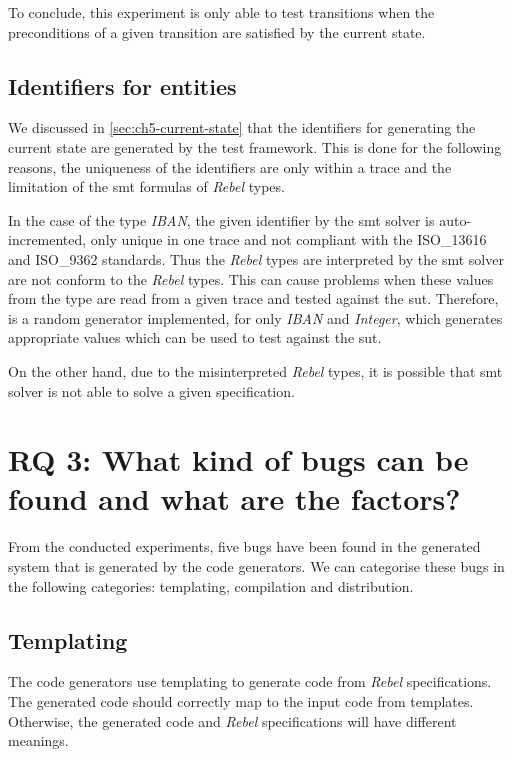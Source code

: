 To conclude, this experiment is only able to test transitions when the
preconditions of a given transition are satisfied by the current state.


\subsection{Identifiers for entities}
We discussed in \autoref{sec:ch5-current-state} that the identifiers for
generating the current state are generated by the test framework. This is done
for the following reasons, the uniqueness of the identifiers are only within a
trace and the limitation of the \gls{smt} formulas of \textit{Rebel} types.

In the case of the type \textit{IBAN}, the given identifier by the \gls{smt}
solver is auto-incremented, only unique in one trace and not compliant with the
ISO\_13616 and ISO\_9362 standards. Thus the \textit{Rebel} types are
interpreted by the \gls{smt} solver are not conform to the \textit{Rebel} types.
This can cause problems when these values from the type are read from a given
trace and tested against the \gls{sut}. Therefore, is a random generator
implemented, for only \textit{IBAN} and \textit{Integer}, which generates
appropriate values which can be used to test against the \gls{sut}.

On the other hand, due to the misinterpreted \textit{Rebel} types, it is
possible that \gls{smt} solver is not able to solve a given specification.


\section{RQ 3: What kind of bugs can be found and what are the factors?}

From the conducted experiments, five bugs have been found in the
generated system that is generated by the code generators. We can categorise
these bugs in the following categories: templating, compilation and
distribution.

\subsection{Templating}
The code generators use templating to generate code from \textit{Rebel}
specifications. The generated code should correctly map to the input code from
templates. Otherwise, the generated code and \textit{Rebel} specifications will
have different meanings.

